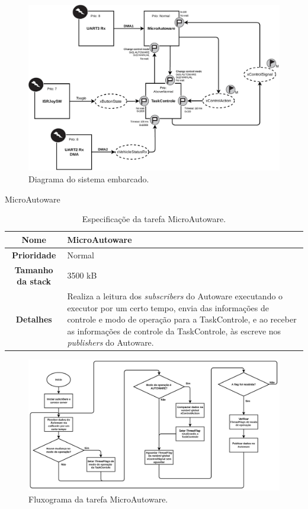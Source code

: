 \begin{figure}[H]
	\centering
	\includegraphics[width = \textwidth]{img/system_diagram}
	\caption{Diagrama do sistema embarcado.}
	\label{fig:systemdiagram}
\end{figure}

\noindent MicroAutoware

\begin{table}[H]
	\centering
	\begin{tabular}{c|p{11.5cm}}
		\textbf{Nome} & MicroAutoware \\
		\hline
		\textbf{Prioridade}& Normal \\
		\hline
		\textbf{Tamanho da stack} & 3500 kB \\
		\hline
		\textbf{Detalhes} & Realiza a leitura dos \textit{subscribers} do Autoware executando o executor por um certo tempo, envia das informações de controle e modo de operação para a TaskControle, e ao receber as informações de controle da TaskControle, às escreve nos \textit{publishers} do Autoware.\\
	\end{tabular}
	\caption{Especificaçõe da tarefa MicroAutoware.}
	\label{tab:microautoware}
\end{table}

\begin{figure}[H]
	\centering
	\includegraphics[width = \textwidth]{img/fluxograma_microautoware}
	\caption{Fluxograma da tarefa MicroAutoware.}
	\label{fig:fluxograma_microautoware}
\end{figure}

